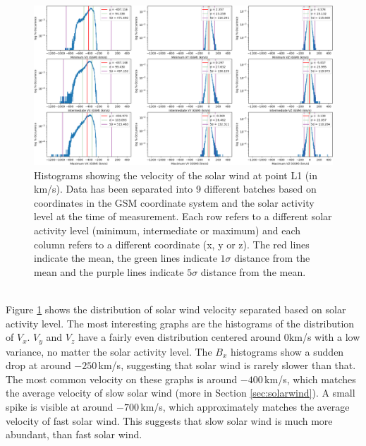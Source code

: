 \documentclass[12pt]{article}
\begin{document}
        \begin{figure}[t!]
            \centering
            \includegraphics[width=\textwidth]{fig_theory/hist_sw_velocity.png}
            \caption{Histograms showing the velocity of the solar wind at point L1 (in km/s). Data has been separated into 9 different batches based on coordinates in the GSM coordinate system and the solar activity level at the time of measurement. Each row refers to a different solar activity level (minimum, intermediate or maximum) and each column refers to a different coordinate (x, y or z). The red lines indicate the mean, the green lines indicate $1\sigma$ distance from the mean and the purple lines indicate $5\sigma$ distance from the mean.}
            \label{fig:hist_sw}
        \end{figure}\\
        Figure \ref{fig:hist_sw} shows the distribution of solar wind velocity separated based on solar activity level. The most interesting graphs are the histograms of the distribution of $V_x$. $V_y$ and $V_z$ have a fairly even distribution centered around 0km/s with a low variance, no matter the solar activity level. The $B_x$ histograms show a sudden drop at around $-250\,$km/s, suggesting that solar wind is rarely slower than that. The most common velocity on these graphs is around $-400\,$km/s, which matches the average velocity of slow solar wind\cite{2001russell} (more in Section \ref{sec:solarwind}). A small spike is visible at around $-700\,$km/s, which approximately matches the average velocity of fast solar wind\cite{2001russell}. This suggests that slow solar wind is much more abundant, than fast solar wind.
\end{document}
